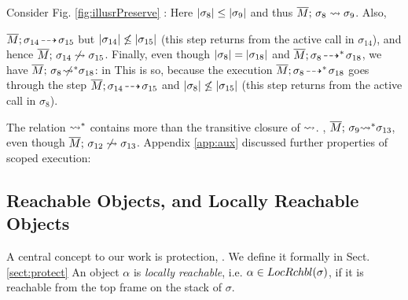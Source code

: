 Consider    Fig. \ref{fig:illusrPreserve} :
Here $|\sigma_8| \leq |\sigma_9|$ and thus $\overline{M};\, {\sigma_8} \rightsquigarrow \sigma_9$. Also,  {$\overline{M};\sigma_{14}\! \dashrightarrow\! {\sigma_{15}}$  but  $|\sigma_{14}| \not\leq |\sigma_{15}| $  (this step returns from the active call in $\sigma_{14}$), and hence   $\overline{M};\, {\sigma_{14}} \not\rightsquigarrow \sigma_{15}$. 
Finally, even though $|\sigma_8| = |\sigma_{18}|$
 and $\overline{M};\sigma_8\! \dashrightarrow^*\! {\sigma_{18}}$, we have  
 $\overline{M};\, {\sigma_8} \not\!\!\!{\rightsquigarrow^*} \sigma_{18}$: in 
This is so, because the execution $\overline{M};\sigma_8\! \dashrightarrow^*\! {\sigma_{18}}$ goes through the step
$\overline{M};\sigma_{14}\! \dashrightarrow\! {\sigma_{15}}$ and  $|\sigma_{8}| \not\leq |\sigma_{15}| $
 (this step returns from the active call in  $\sigma_8$).

\vspace{.1cm}
{The relation ${\rightsquigarrow^*}$ contains more than the transitive closure of  $\rightsquigarrow$.
\Eg, ${\overline{M};\, {\sigma_9} {\rightsquigarrow^*} \sigma_{13}}$, even though ${\overline{M};\, {\sigma_{12}} \not\rightsquigarrow \sigma_{13}}$.} 
%
Appendix \ref{app:aux} discussed further properties of scoped execution:

 








  \subsection{Reachable  Objects, and Locally Reachable Objects}
  
 {A central concept to our work is %
protection, . We define it formally in  Sect. \ref{sect:protect}}
An object
$\alpha$ is
 \emph{locally reachable}, i.e. $\alpha \in  LocRchbl(\sigma) $, if it is reachable from the top frame on the stack of $\sigma$.
 
}
